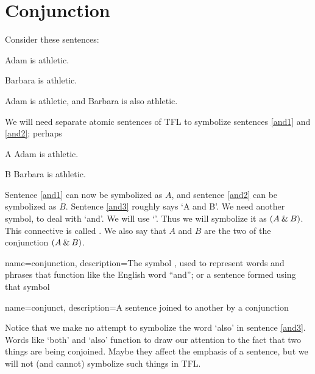 \section{Conjunction}
\label{s:ConnectiveConjunction}

Consider these sentences:
	\begin{earg}
		\item[\ex{and1}]Adam is athletic.
		\item[\ex{and2}]Barbara is athletic.
		\item[\ex{and3}]Adam is athletic, and Barbara is also athletic.
	\end{earg}
We will need separate atomic sentences of TFL to symbolize sentences \ref{and1} and \ref{and2}; perhaps
	\begin{ekey}
		\item[A] Adam is athletic.
		\item[B] Barbara is athletic.
	\end{ekey}
Sentence \ref{and1} can now be symbolized as $A$, and sentence \ref{and2} can be symbolized as $B$. Sentence \ref{and3} roughly says `A and B'. We need another symbol, to deal with `and'. We will use `\eand'. Thus we will symbolize it as $(A\mathbin{\&} B)$. This connective is called . We also say that $A$ and $B$ are the two  of the conjunction $(A \mathbin{\&} B)$.



{
name=conjunction,
description={The symbol \eand, used to represent words and phrases that function like the English word ``and''; or a sentence formed using that symbol}
}

{
name=conjunct,
description={A sentence joined to another by a \gls{conjunction}}
}


Notice that we make no attempt to symbolize the word `also' in sentence \ref{and3}. Words like `both' and `also' function to draw our attention to the fact that two things are being conjoined. Maybe they affect the emphasis of a sentence, but we will not (and cannot) symbolize such things in TFL.

